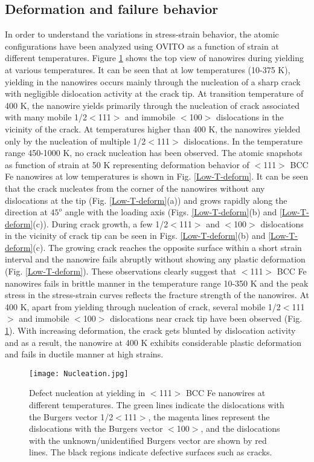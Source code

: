 \documentclass[%
reprint,%
 amssymb, amsmath,%
 aip,apl,%
]{revtex4-1}
\begin{document}
\subsection{Deformation and failure behavior}

In order to understand the variations in stress-strain behavior, the atomic configurations have been analyzed using OVITO as a function 
of strain at different temperatures. Figure \ref{Nucleation} shows the top view of nanowires during yielding at various temperatures. 
It can be seen that at low temperatures (10-375 K), yielding in the nanowires occurs mainly through the nucleation of a sharp crack 
with negligible dislocation activity at the crack tip. At transition temperature of 400 K, the nanowire yields primarily through the
nucleation of crack associated with many mobile 1/2$<$111$>$ and immobile $<$100$>$ dislocations in the vicinity of the crack. At 
temperatures higher than 400 K, the nanowires yielded only by the nucleation of multiple 1/2$<$111$>$ dislocations. In the temperature 
range 450-1000 K, no crack nucleation has been observed. The atomic snapshots as function of strain at 50 K representing deformation 
behavior of $<$111$>$ BCC Fe nanowires at low temperatures is shown in Fig. \ref{Low-T-deform}. It can be seen that the crack nucleates 
from the corner of the nanowires without any dislocations at the tip (Fig. \ref{Low-T-deform}(a)) and grows rapidly along the direction 
at $45^o$ angle with the loading axis (Figs. \ref{Low-T-deform}(b) and \ref{Low-T-deform}(c)). During crack growth, a few 1/2$<$111$>$ 
and $<$100$>$ dislocations in the vicinity of crack tip can be seen in Figs. \ref{Low-T-deform}(b) and \ref{Low-T-deform}(c). The growing 
crack reaches the opposite surface within a short strain interval and the nanowire fails abruptly without showing any plastic deformation 
(Fig. \ref{Low-T-deform}). These observations clearly suggest that $<$111$>$ BCC Fe nanowires fails in brittle manner in the temperature
range 10-350 K and the peak stress in the stress-strain curves reflects the fracture strength of the nanowires. At 400 K, apart from 
yielding through nucleation of crack, several mobile 1/2$<$111$>$ and immobile $<$100$>$ dislocations near crack tip have been observed 
(Fig. \ref{Nucleation}). With increasing deformation, the crack gets blunted by dislocation activity and as a result, the nanowire at 
400 K exhibits considerable plastic deformation and fails in ductile manner at high strains.

\begin{figure}
\centering
\texttt{[image: Nucleation.jpg]}
\caption { Defect nucleation at yielding in $<$111$>$ BCC Fe nanowires at different temperatures. The green lines indicate
the dislocations with the Burgers vector 1/2$<$111$>$, the magenta lines represent the dislocations with the Burgers vector $<$100$>$, 
and the dislocations with the unknown/unidentified Burgers vector are shown by red lines. The black regions indicate defective surfaces
such as cracks.}
\label{Nucleation}
\end{figure}
\end{document}
